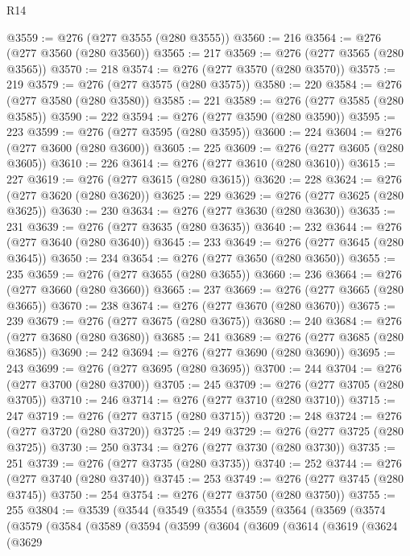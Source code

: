 \begin{lexlean}{R14}
\begin{coremodule}
@3559 := @276 (@277 @3555 (@280 @3555))
@3560 := 216
@3564 := @276 (@277 @3560 (@280 @3560))
@3565 := 217
@3569 := @276 (@277 @3565 (@280 @3565))
@3570 := 218
@3574 := @276 (@277 @3570 (@280 @3570))
@3575 := 219
@3579 := @276 (@277 @3575 (@280 @3575))
@3580 := 220
@3584 := @276 (@277 @3580 (@280 @3580))
@3585 := 221
@3589 := @276 (@277 @3585 (@280 @3585))
@3590 := 222
@3594 := @276 (@277 @3590 (@280 @3590))
@3595 := 223
@3599 := @276 (@277 @3595 (@280 @3595))
@3600 := 224
@3604 := @276 (@277 @3600 (@280 @3600))
@3605 := 225
@3609 := @276 (@277 @3605 (@280 @3605))
@3610 := 226
@3614 := @276 (@277 @3610 (@280 @3610))
@3615 := 227
@3619 := @276 (@277 @3615 (@280 @3615))
@3620 := 228
@3624 := @276 (@277 @3620 (@280 @3620))
@3625 := 229
@3629 := @276 (@277 @3625 (@280 @3625))
@3630 := 230
@3634 := @276 (@277 @3630 (@280 @3630))
@3635 := 231
@3639 := @276 (@277 @3635 (@280 @3635))
@3640 := 232
@3644 := @276 (@277 @3640 (@280 @3640))
@3645 := 233
@3649 := @276 (@277 @3645 (@280 @3645))
@3650 := 234
@3654 := @276 (@277 @3650 (@280 @3650))
@3655 := 235
@3659 := @276 (@277 @3655 (@280 @3655))
@3660 := 236
@3664 := @276 (@277 @3660 (@280 @3660))
@3665 := 237
@3669 := @276 (@277 @3665 (@280 @3665))
@3670 := 238
@3674 := @276 (@277 @3670 (@280 @3670))
@3675 := 239
@3679 := @276 (@277 @3675 (@280 @3675))
@3680 := 240
@3684 := @276 (@277 @3680 (@280 @3680))
@3685 := 241
@3689 := @276 (@277 @3685 (@280 @3685))
@3690 := 242
@3694 := @276 (@277 @3690 (@280 @3690))
@3695 := 243
@3699 := @276 (@277 @3695 (@280 @3695))
@3700 := 244
@3704 := @276 (@277 @3700 (@280 @3700))
@3705 := 245
@3709 := @276 (@277 @3705 (@280 @3705))
@3710 := 246
@3714 := @276 (@277 @3710 (@280 @3710))
@3715 := 247
@3719 := @276 (@277 @3715 (@280 @3715))
@3720 := 248
@3724 := @276 (@277 @3720 (@280 @3720))
@3725 := 249
@3729 := @276 (@277 @3725 (@280 @3725))
@3730 := 250
@3734 := @276 (@277 @3730 (@280 @3730))
@3735 := 251
@3739 := @276 (@277 @3735 (@280 @3735))
@3740 := 252
@3744 := @276 (@277 @3740 (@280 @3740))
@3745 := 253
@3749 := @276 (@277 @3745 (@280 @3745))
@3750 := 254
@3754 := @276 (@277 @3750 (@280 @3750))
@3755 := 255
@3804 := @3539
    (@3544
      (@3549
        (@3554
          (@3559
            (@3564
              (@3569
                (@3574
                  (@3579
                    (@3584
                      (@3589
                        (@3594
                          (@3599
                            (@3604
                              (@3609
                                (@3614
                                  (@3619
                                    (@3624
                                      (@3629

\end{coremodule}
\end{lexlean}
